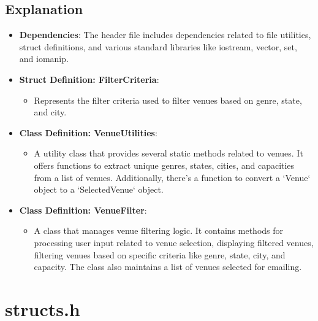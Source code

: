 \documentclass{article}
\begin{document}
	\subsection*{Explanation}
	\begin{itemize}
		\item \textbf{Dependencies}: The header file includes dependencies related to file utilities, struct definitions, and various standard libraries like iostream, vector, set, and iomanip.
		
		\item \textbf{Struct Definition: FilterCriteria}:
		\begin{itemize}
			\item Represents the filter criteria used to filter venues based on genre, state, and city.
		\end{itemize}
		
		\item \textbf{Class Definition: VenueUtilities}:
		\begin{itemize}
			\item A utility class that provides several static methods related to venues. It offers functions to extract unique genres, states, cities, and capacities from a list of venues. Additionally, there's a function to convert a `Venue` object to a `SelectedVenue` object.
		\end{itemize}
		
		\item \textbf{Class Definition: VenueFilter}:
		\begin{itemize}
			\item A class that manages venue filtering logic. It contains methods for processing user input related to venue selection, displaying filtered venues, filtering venues based on specific criteria like genre, state, city, and capacity. The class also maintains a list of venues selected for emailing.
		\end{itemize}
	\end{itemize}
		
	\section{structs.h}
	
\end{document}
